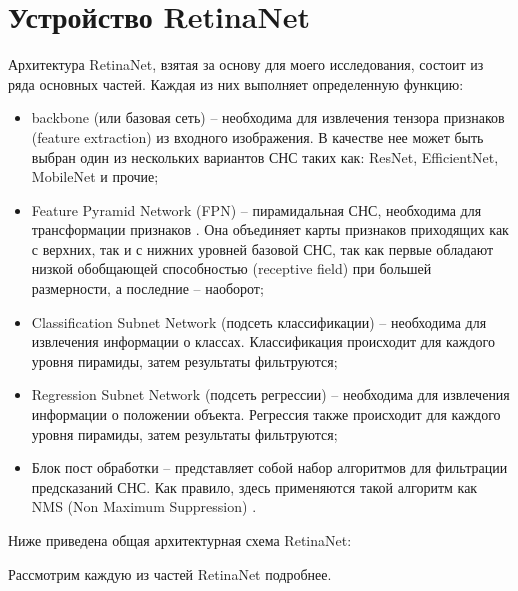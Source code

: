 \section{Устройство RetinaNet}\label{sect-5}

Архитектура RetinaNet, взятая за основу для моего исследования, состоит из ряда основных частей. Каждая из них выполняет определенную функцию:
\begin{itemize}
    \item backbone (или базовая сеть) -- необходима для извлечения тензора признаков (feature extraction) из входного изображения. В качестве нее может быть выбран один из нескольких вариантов СНС таких как: ResNet, EfficientNet, MobileNet и прочие;
    \item Feature Pyramid Network (FPN) -- пирамидальная СНС, необходима для трансформации признаков \cite{lib-fpn}. Она объединяет карты признаков приходящих как с верхних, так и с нижних уровней базовой СНС, так как первые обладают низкой обобщающей способностью (receptive field) при большей размерности, а последние -- наоборот;
    \item Classification Subnet Network (подсеть классификации) -- необходима для извлечения информации о классах. Классификация происходит для каждого уровня пирамиды, затем результаты фильтруются;
    \item Regression Subnet Network (подсеть регрессии) -- необходима для извлечения информации о положении объекта. Регрессия также происходит для каждого уровня пирамиды, затем результаты фильтруются;
    \item Блок пост обработки -- представляет собой набор алгоритмов для фильтрации предсказаний СНС. Как правило, здесь применяются такой алгоритм как NMS (Non Maximum Suppression) \cite{lib-nms}.
\end{itemize}

Ниже приведена общая архитектурная схема RetinaNet:


Рассмотрим каждую из частей RetinaNet подробнее.








\clearpage